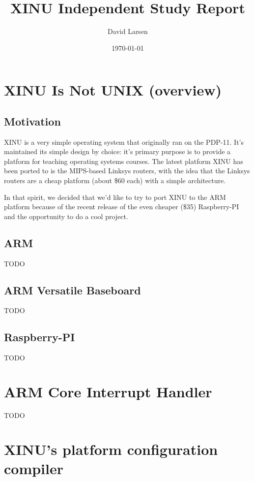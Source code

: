 \documentclass[12pt]{article}
\title{XINU Independent Study Report}
\author{David Larsen}
\date{\today}
\newcommand{\TODO}[1]{{\huge\color{red}TODO \Large #1}}
\begin{document}
\maketitle

\tableofcontents

\section{XINU Is Not U{\small NIX} (overview)}

\subsection{Motivation}

XINU is a very simple operating system that originally ran on the PDP-11. It's
maintained its simple design by choice: it's primary purpose is to provide a
platform for teaching operating systems courses. The latest platform XINU has
been ported to is the MIPS-based Linksys routers, with the idea that the
Linksys routers are a cheap platform (about \$60 each) with a simple
architecture.

In that spirit, we decided that we'd like to try to port XINU to the ARM
platform because of the recent release of the even cheaper (\$35) Raspberry-PI
and the opportunity to do a cool project.

\subsection{ARM}

\TODO{}

\subsection{ARM Versatile Baseboard}

\TODO{}

\subsection{Raspberry-PI}

\TODO{}

\section{ARM Core Interrupt Handler}

\TODO{}

\section{XINU's platform configuration compiler}
\end{document}
